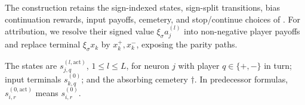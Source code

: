 The construction retains the sign-indexed states, sign-split transitions, bias continuation rewards,
input payoffs, cemetery, and stop/continue choices of \textcite{Gaubert2025}. For attribution, we
resolve their signed value $\xi_\sigma a_j^{(l)}$ into non-negative player payoffs and replace terminal
$\xi_\sigma x_k$ by $x_k^+,x_k^-$, exposing the parity paths.

\begin{definition}\label{ptnb:def:adf-game-states}
The states are $s_{j,q}^{(l,\mathrm{act})}$, $1\leq l\leq L$, for neuron $j$ with player
$q\in\{+,-\}$ in turn; input terminals $s_{k,q}^{(0)}$; and the absorbing cemetery $\dagger$.
In predecessor formulas, $s_{i,r}^{(0,\mathrm{act})}$ means $s_{i,r}^{(0)}$.
\end{definition}

